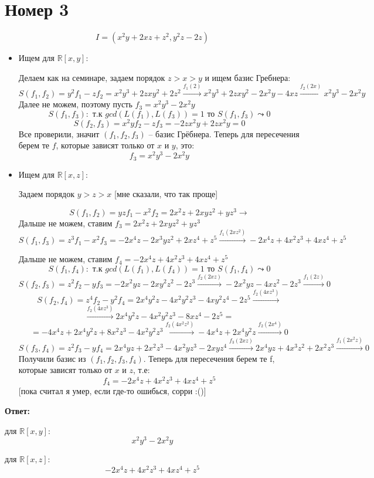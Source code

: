 \documentclass[a4paper,12pt]{article}
\begin{document}
\section*{Номер 3}
\[
I = (x^2y + 2xz + z^2, y^2z - 2z)
\]
\begin{itemize}
\item Ищем для $\mathbb{R}[x, y]$:

Делаем как на семинаре, задаем порядок $z > x > y$ и ищем базис Гребнера:
\[
S(f_1, f_2) = y^2f_1 - zf_2 = x^2y^3 + 2zxy^2 + 2z^2 \stackrel{f_1(2)}{\rightarrow} x^2y^3 + 2zxy^2 -2x^2y - 4xz \stackrel{f_2(2x)}{\rightarrow} x^2y^3 -2x^2y
\]
Далее не можем, поэтому пусть $f_3 = x^2y^3 -2x^2y$
\[
S(f_1, f_3) : \text{ т.к }gcd(L(f_1), L(f_3)) = 1 \text{ то } S(f_1, f_3) \leadsto 0
\]
\[
S(f_2, f_3) = x^2y f_2 - zf_3 = -2zx^2y + 2zx^2y = 0
\]
Все проверили, значит $(f_1, f_2, f_3)$ -- базис Грёбнера. Теперь для пересечения берем те $f$, которые зависят только от $x$ и $y$, это:
\[
f_3 = x^2y^3 -2x^2y
\]
\item Ищем для $\mathbb{R}[x, z]$:

Задаем порядок $ y > z > x$ [мне сказали, что так проще]

\[
S(f_1, f_2) = yzf_1 - x^2f_2 = 2 x^2 z + 2 x y z^2 + y z^3 \stackrel{}{\rightarrow}
\]
Дальше не можем, ставим $f_3 =2 x^2 z + 2 x y z^2 + y z^3$
\[
S(f_1, f_3) = z^3f_1 - x^2f_3 = -2 x^4 z - 2 x^3 y z^2 + 2 x z^4 + z^5 \stackrel{f_1(2xz^2)}{\rightarrow} -2 x^4 z + 4 x^2 z^3 + 4 x z^4 + z^5
\]

Дальше не можем, ставим $f_4 = -2 x^4 z + 4 x^2 z^3 + 4 x z^4 + z^5$
\[
S(f_1, f_4) : \text{ т.к }gcd(L(f_1), L(f_4)) = 1 \text{ то } S(f_1, f_4) \leadsto 0
\]
\[
S(f_2, f_3) = z^2f_2 - yf_3 = -2 x^2 y z - 2 x y^2 z^2 - 2 z^3 \stackrel{f_2(2xz)}{\rightarrow} -2 x^2 y z - 4 x z^2 - 2 z^3 \stackrel{f_1(2z)}{\rightarrow} 0 
\]
\[
S(f_2, f_4) = z^4f_2 - y^2f_4 = 2 x^4 y^2 z - 4 x^2 y^2 z^3 - 4 x y^2 z^4 - 2 z^5 \stackrel{f_2(4xz^3)}{\rightarrow} \]
\[
\stackrel{f_2(4xz^3)}{\rightarrow}
2 x^4 y^2 z - 4 x^2 y^2 z^3 - 8 x z^4 - 2 z^5 = 
\]
\[
= -4 x^4 z + 2 x^4 y^2 z + 8 x^2 z^3 - 4 x^2 y^2 z^3 \stackrel{f_2(4x^2z^2)}{\rightarrow} -4 x^4 z + 2 x^4 y^2 z \stackrel{f_2(2x^4)}{\rightarrow} 0 
\]
\[
S(f_3, f_4) = z^2f_3 - yf_4 = 2 x^4 y z + 2 x^2 z^3 - 4 x^2 y z^3 - 2 x y z^4 \stackrel{f_3(2xz)}{\rightarrow} 2 x^4 y z + 4 x^3 z^2 + 2 x^2 z^3 \stackrel{f_1(2x^2z)}{\rightarrow} 0
\]
Получили базис из $(f_1, f_2, f_3, f_4)$. Теперь для пересечения берем те f, которые зависят только от $x$ и $z$, т.е:
\[
f_4 = -2 x^4 z + 4 x^2 z^3 + 4 x z^4 + z^5
\]
[пока считал я умер, если где-то ошибься, сорри :()]
\end{itemize}
\begin{center}
\textbf{Ответ: } 

для $\mathbb{R}[x, y]:$
\[
x^2y^3 -2x^2y
\]

для $\mathbb{R}[x, z]:$
\[
 -2 x^4 z + 4 x^2 z^3 + 4 x z^4 + z^5
\]
\end{center}
\end{document}
